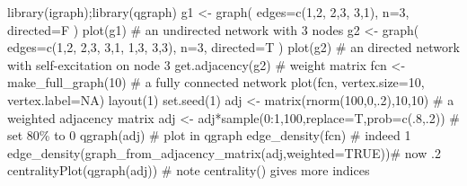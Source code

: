 \documentclass[
  a4paper,
  DIV=11,
  numbers=noendperiod,
  oneside]{scrreprt}
\newenvironment{Shaded}{}{}
\newcommand{\AttributeTok}[1]{\textcolor[rgb]{0.84,0.23,0.29}{#1}}
\newcommand{\CommentTok}[1]{\textcolor[rgb]{0.42,0.45,0.49}{#1}}
\newcommand{\ConstantTok}[1]{\textcolor[rgb]{0.00,0.36,0.77}{#1}}
\newcommand{\DecValTok}[1]{\textcolor[rgb]{0.00,0.36,0.77}{#1}}
\newcommand{\FunctionTok}[1]{\textcolor[rgb]{0.44,0.26,0.76}{#1}}
\newcommand{\NormalTok}[1]{\textcolor[rgb]{0.14,0.16,0.18}{#1}}
\newcommand{\OtherTok}[1]{\textcolor[rgb]{0.44,0.26,0.76}{#1}}
\newcommand{\SpecialCharTok}[1]{\textcolor[rgb]{0.00,0.36,0.77}{#1}}
\begin{document}
\begin{Shaded}
\begin{Highlighting}[]
\FunctionTok{library}\NormalTok{(igraph);}\FunctionTok{library}\NormalTok{(qgraph)}
\NormalTok{g1 }\OtherTok{\textless{}{-}} \FunctionTok{graph}\NormalTok{( }\AttributeTok{edges=}\FunctionTok{c}\NormalTok{(}\DecValTok{1}\NormalTok{,}\DecValTok{2}\NormalTok{, }\DecValTok{2}\NormalTok{,}\DecValTok{3}\NormalTok{, }\DecValTok{3}\NormalTok{,}\DecValTok{1}\NormalTok{), }\AttributeTok{n=}\DecValTok{3}\NormalTok{, }\AttributeTok{directed=}\NormalTok{F ) }
\FunctionTok{plot}\NormalTok{(g1) }\CommentTok{\# an undirected network with 3 nodes}
\NormalTok{g2 }\OtherTok{\textless{}{-}} \FunctionTok{graph}\NormalTok{( }\AttributeTok{edges=}\FunctionTok{c}\NormalTok{(}\DecValTok{1}\NormalTok{,}\DecValTok{2}\NormalTok{, }\DecValTok{2}\NormalTok{,}\DecValTok{3}\NormalTok{, }\DecValTok{3}\NormalTok{,}\DecValTok{1}\NormalTok{, }\DecValTok{1}\NormalTok{,}\DecValTok{3}\NormalTok{, }\DecValTok{3}\NormalTok{,}\DecValTok{3}\NormalTok{), }\AttributeTok{n=}\DecValTok{3}\NormalTok{, }\AttributeTok{directed=}\NormalTok{T ) }
\FunctionTok{plot}\NormalTok{(g2) }\CommentTok{\# an directed network with self{-}excitation on node 3}
\FunctionTok{get.adjacency}\NormalTok{(g2) }\CommentTok{\# weight matrix}
\NormalTok{fcn }\OtherTok{\textless{}{-}} \FunctionTok{make\_full\_graph}\NormalTok{(}\DecValTok{10}\NormalTok{) }\CommentTok{\# a fully connected network}
\FunctionTok{plot}\NormalTok{(fcn, }\AttributeTok{vertex.size=}\DecValTok{10}\NormalTok{, }\AttributeTok{vertex.label=}\ConstantTok{NA}\NormalTok{)}
\FunctionTok{layout}\NormalTok{(}\DecValTok{1}\NormalTok{)}
\FunctionTok{set.seed}\NormalTok{(}\DecValTok{1}\NormalTok{)}
\NormalTok{adj }\OtherTok{\textless{}{-}} \FunctionTok{matrix}\NormalTok{(}\FunctionTok{rnorm}\NormalTok{(}\DecValTok{100}\NormalTok{,}\DecValTok{0}\NormalTok{,.}\DecValTok{2}\NormalTok{),}\DecValTok{10}\NormalTok{,}\DecValTok{10}\NormalTok{) }\CommentTok{\# a weighted adjacency matrix}
\NormalTok{adj }\OtherTok{\textless{}{-}}\NormalTok{ adj}\SpecialCharTok{*}\FunctionTok{sample}\NormalTok{(}\DecValTok{0}\SpecialCharTok{:}\DecValTok{1}\NormalTok{,}\DecValTok{100}\NormalTok{,}\AttributeTok{replace=}\NormalTok{T,}\AttributeTok{prob=}\FunctionTok{c}\NormalTok{(.}\DecValTok{8}\NormalTok{,.}\DecValTok{2}\NormalTok{)) }\CommentTok{\# set 80\% to 0}
\FunctionTok{qgraph}\NormalTok{(adj) }\CommentTok{\# plot in qgraph}
\FunctionTok{edge\_density}\NormalTok{(fcn) }\CommentTok{\# indeed 1}
\FunctionTok{edge\_density}\NormalTok{(}\FunctionTok{graph\_from\_adjacency\_matrix}\NormalTok{(adj,}\AttributeTok{weighted=}\ConstantTok{TRUE}\NormalTok{))}\CommentTok{\# now .2}
\FunctionTok{centralityPlot}\NormalTok{(}\FunctionTok{qgraph}\NormalTok{(adj)) }\CommentTok{\# note centrality() gives more indices}
\end{Highlighting}
\end{Shaded}
\end{document}
